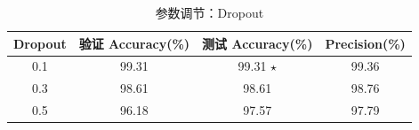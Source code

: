 \begin{table}[htbp]\centering
\caption{参数调节：Dropout}
\label{tab:sweepdropout}
\begin{tabular}{cccc}
\toprule
Dropout & 验证 Accuracy(\%) & 测试 Accuracy(\%) & Precision(\%) \\
\midrule
0.1 & 99.31 & 99.31 $\star$ & 99.36 \\
0.3 & 98.61 & 98.61 & 98.76 \\
0.5 & 96.18 & 97.57 & 97.79 \\
\bottomrule
\end{tabular}
\end{table}
